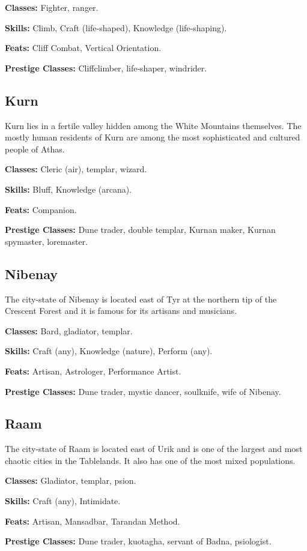 \documentclass[10pt,a4paper,twocolumn]{d20}
\begin{document}
{\textbf{Classes:} Fighter, ranger.

\textbf{Skills:} Climb, Craft (life‐shaped), Knowledge (life‐shaping).

\textbf{Feats:} Cliff Combat, Vertical Orientation.

\textbf{Prestige Classes:} Cliffclimber, life‐shaper, windrider.


\subsection{Kurn}
Kurn lies in a fertile valley hidden among the White Mountains themselves. The mostly human residents of Kurn are among the most sophisticated and cultured people of Athas.

\textbf{Classes:} Cleric (air), templar, wizard.

\textbf{Skills:} Bluff, Knowledge (arcana).

\textbf{Feats:} Companion.

\textbf{Prestige Classes:} Dune trader, double templar, Kurnan maker, Kurnan spymaster, loremaster.

\subsection{Nibenay}
The city‐state of Nibenay is located east of Tyr at the northern tip of the Crescent Forest and it is famous for its artisans and musicians.

\textbf{Classes:} Bard, gladiator, templar.

\textbf{Skills:} Craft (any), Knowledge (nature), Perform (any).

\textbf{Feats:} Artisan, Astrologer, Performance Artist.

\textbf{Prestige Classes:} Dune trader, mystic dancer, soulknife, wife of Nibenay.

\subsection{Raam}
The city‐state of Raam is located east of Urik and is one of the largest and most chaotic cities in the Tablelands. It also has one of the most mixed populations.

\textbf{Classes:} Gladiator, templar, psion.

\textbf{Skills:} Craft (any), Intimidate.

\textbf{Feats:} Artisan, Mansadbar, Tarandan Method.

\textbf{Prestige Classes:} Dune trader, kuotagha, servant of Badna, psiologist.

}
\end{document}
